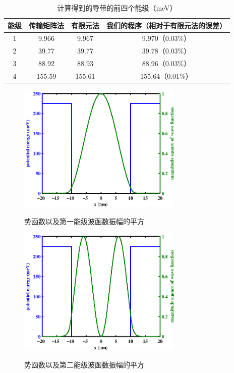 \documentclass{ZJUthesis}
\begin{document}
\begin{table}[!t]
    \caption{计算得到的导带的前四个能级（meV）}
    \centering
    \label{tmm_sample_result}
    \begin{tabular}{cccc}
        \hline
        能级 & 传输矩阵法\cite{jonsson1990solving} & 有限元法\cite{nakamura1989finite} & 我们的程序（相对于有限元法的误差） \\
        \hline
        1       & 9.966              & 9.967            & 9.970（0.03\%） \\
        2       & 39.77              & 39.77            & 39.78（0.03\%） \\
        3       & 88.92              & 88.93            & 88.96（0.03\%） \\
        4       & 155.59            & 155.61          & 155.64（0.01\%） \\
        \hline
    \end{tabular}
\end{table}

\begin{figure}[!htb]
  \centering
  \includegraphics[width=0.7\textwidth]{./Pictures/wave1.eps}\\
  \caption{势函数以及第一能级波函数振幅的平方}
  \label{fig_wave1}
\end{figure}

\begin{figure}[!htb]
  \centering
  \includegraphics[width=0.7\textwidth]{./Pictures/wave2.eps}\\
  \caption{势函数以及第二能级波函数振幅的平方}
  \label{fig_wave2}
\end{figure}
\end{document}
